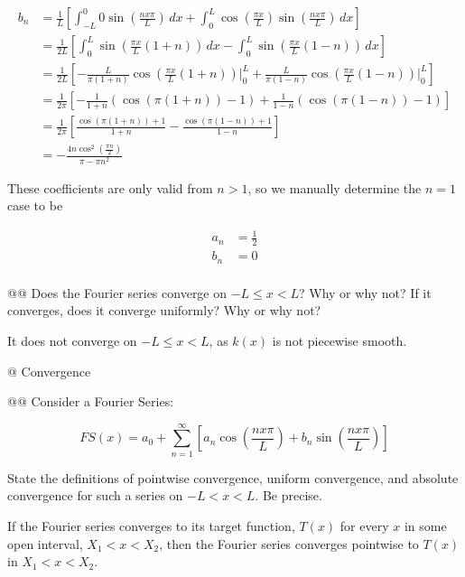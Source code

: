 \documentclass[10pt]{article}
\begin{document}
\begin{easylist}[enumerate]
    \begin{align*}
        b_n &= \frac{1}{L} \left[ \int_{-L}^0 0 \sin\left(\frac{nx\pi}{L}\right) \, dx + \int_0^L \cos\left(\frac{\pi x}{L}\right) \sin\left(\frac{nx\pi}{L}\right) \, dx \right]\\
            &= \frac{1}{2L} \left[ \int_0^L \sin\left(\frac{\pi x}{L}(1+n)\right) \, dx - \int_0^L \sin\left(\frac{\pi x}{L}(1-n)\right) \, dx \right]\\
            &= \frac{1}{2L} \left[ -\frac{L}{\pi(1+n)} \cos\left(\frac{\pi x}{L}(1+n)\right)\bigg|_0^L + \frac{L}{\pi(1-n)} \cos\left(\frac{\pi x}{L}(1-n)\right)\bigg|_0^L \right]\\
            &= \frac{1}{2\pi} \left[ -\frac{1}{1+n} (\cos(\pi(1+n)) - 1) + \frac{1}{1-n} ( \cos(\pi(1-n)) - 1) \right]\\
            &= \frac{1}{2\pi} \left[ \frac{\cos(\pi(1+n)) + 1}{1+n} - \frac{\cos(\pi(1-n)) + 1}{1-n}  \right]\\
            &= -\frac{4 n \cos^2\left(\frac{\pi n}{2}\right)}{\pi -\pi n^2}
    \end{align*}

    These coefficients are only valid from $n > 1$, so we manually determine the $n = 1$ case to be

    \begin{align*}
        a_n &= \frac{1}{2}\\
        b_n &= 0\\
    \end{align*}

    @@ Does the Fourier series converge on $-L \le x < L$? Why or why not? If it converges, does it converge uniformly?
    Why or why not?

    It does not converge on $-L \le x < L$, as $k(x)$ is not piecewise smooth.

    \newpage
    @ Convergence

    @@ Consider a Fourier Series:

    \[
        FS(x) = a_0 + \sum_{n=1}^\infty \left[ a_n \cos\left(\frac{nx\pi}{L}\right) + b_n \sin\left(\frac{nx\pi}{L}\right) \right]
    \]

    State the definitions of pointwise convergence, uniform convergence, and absolute convergence for such a series on
    $-L < x < L$. Be precise.\\

    \begin{definition}
        If the Fourier series converges to its target function, $T(x)$ for every $x$ in some open interval, $X_1<x<X_2$,
        then the Fourier series converges pointwise to $T(x)$ in $X_1<x<X_2$.
    \end{definition}


\end{easylist}
\end{document}
